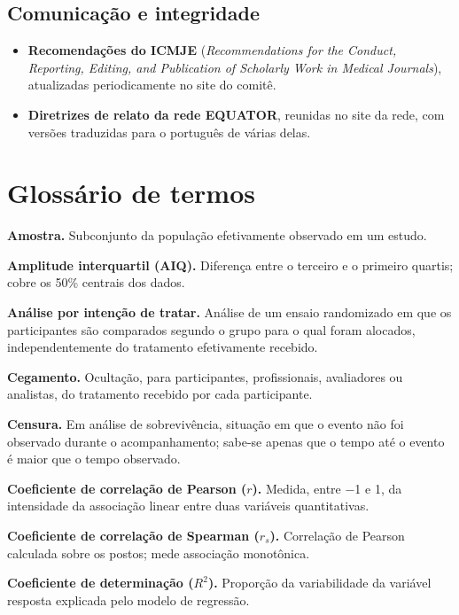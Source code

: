 \documentclass[
]{book}
\providecommand{\tightlist}{%
  \setlength{\itemsep}{0pt}\setlength{\parskip}{0pt}}
\begin{document}
\subsection{Comunicação e integridade}\label{comunicauxe7uxe3o-e-integridade}

\begin{itemize}
\tightlist
\item
  \textbf{Recomendações do ICMJE} (\emph{Recommendations for the Conduct, Reporting, Editing, and Publication of Scholarly Work in Medical Journals}), atualizadas periodicamente no site do comitê.
\item
  \textbf{Diretrizes de relato da rede EQUATOR}, reunidas no site da rede, com versões traduzidas para o português de várias delas.
\end{itemize}

\section{Glossário de termos}\label{glossuxe1rio-de-termos}

\textbf{Amostra.} Subconjunto da população efetivamente observado em um estudo.

\textbf{Amplitude interquartil (AIQ).} Diferença entre o terceiro e o primeiro quartis; cobre os 50\% centrais dos dados.

\textbf{Análise por intenção de tratar.} Análise de um ensaio randomizado em que os participantes são comparados segundo o grupo para o qual foram alocados, independentemente do tratamento efetivamente recebido.

\textbf{Cegamento.} Ocultação, para participantes, profissionais, avaliadores ou analistas, do tratamento recebido por cada participante.

\textbf{Censura.} Em análise de sobrevivência, situação em que o evento não foi observado durante o acompanhamento; sabe-se apenas que o tempo até o evento é maior que o tempo observado.

\textbf{Coeficiente de correlação de Pearson (\(r\)).} Medida, entre −1 e 1, da intensidade da associação linear entre duas variáveis quantitativas.

\textbf{Coeficiente de correlação de Spearman (\(r_s\)).} Correlação de Pearson calculada sobre os postos; mede associação monotônica.

\textbf{Coeficiente de determinação (\(R^2\)).} Proporção da variabilidade da variável resposta explicada pelo modelo de regressão.
\end{document}
